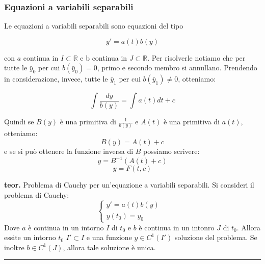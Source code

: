 \subsubsection*{Equazioni a variabili separabili}
Le equazioni a variabili separabili sono equazioni del tipo
\begin{tcolorbox}
\[
    y' =a(t) b(y)
\]
\end{tcolorbox}
con $a$ continua in $I \subset \mathbb{R}$ e b continua in $J \subset \mathbb{R}$.\newline
Per risolverle notiamo che per tutte le $\bar{y}_0$ per cui $b(\bar{y}_0) = 0$, primo e secondo membro si annullano.\newline
Prendendo in considerazione, invece, tutte le $\bar{y}_1$ per cui $b(\bar{y}_1) \neq 0$, otteniamo:
\begin{tcolorbox}
\[
    \int \frac{dy}{b(y)} = \int a(t) dt +c 
\]
\end{tcolorbox}
Quindi se $B(y)$ è una primitiva di $\frac{1}{b(y)}$ e $A(t)$ è una primitiva di $a(t)$, otteniamo:
\[
    B(y) = A(t) + c
\]
e se si può ottenere la funzione inversa di $B$ possiamo scrivere:
\[
    y = B^{-1}(A(t) + c)
\]
\[
    y = F(t,c)
\]
\begin{tcolorbox}
\textbf{teor.} Problema di Cauchy per un'equazione a variabili separabili.\newline
Si consideri il problema di Cauchy:
\[
    \begin{cases}
        y' = a(t) b(y)&\\
        y(t_0) = y_0&
    \end{cases}
\]
Dove $a$ è continua in un intorno $I$ di $t_0$ e $b$ è continua in un intonro $J$ di $t_0$. Allora essite un intorno $t_0$ $I' \subset I$ e una funzione $y \in C^1(I')$ soluzione del problema.\newline
Se inoltre $b \in C^1(J)$, allora tale soluzione è unica.\newline
\end{tcolorbox}
\rule{\textwidth}{0,4pt}
